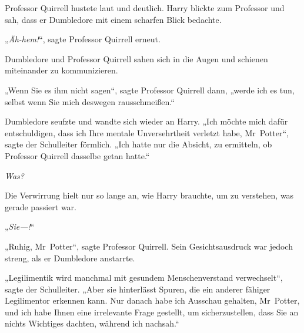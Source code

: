 Professor Quirrell hustete laut und deutlich. Harry blickte zum Professor und sah, dass er Dumbledore mit einem scharfen Blick bedachte.

„\emph{Äh-hem!}“, sagte Professor Quirrell erneut.

Dumbledore und Professor Quirrell sahen sich in die Augen und schienen miteinander zu kommunizieren.

„Wenn Sie es ihm nicht sagen“, sagte Professor Quirrell dann, „werde ich es tun, selbst wenn Sie mich deswegen rausschmeißen.“

Dumbledore seufzte und wandte sich wieder an Harry. „Ich möchte mich dafür entschuldigen, dass ich Ihre mentale Unversehrtheit verletzt habe, Mr~Potter“, sagte der Schulleiter förmlich. „Ich hatte nur die Absicht, zu ermitteln, ob Professor Quirrell dasselbe getan hatte.“

\emph{Was?}

Die Verwirrung hielt nur so lange an, wie Harry brauchte, um zu verstehen, was gerade passiert war.

„\emph{Sie—!}“

„Ruhig, Mr~Potter“, sagte Professor Quirrell. Sein Gesichtsausdruck war jedoch streng, als er Dumbledore anstarrte.

„Legilimentik wird manchmal mit gesundem Menschenverstand verwechselt“, sagte der Schulleiter. „Aber sie hinterlässt Spuren, die ein anderer fähiger Legilimentor erkennen kann. Nur danach habe ich Ausschau gehalten, Mr~Potter, und ich habe Ihnen eine irrelevante Frage gestellt, um sicherzustellen, dass Sie an nichts Wichtiges dachten, während ich nachsah.“

